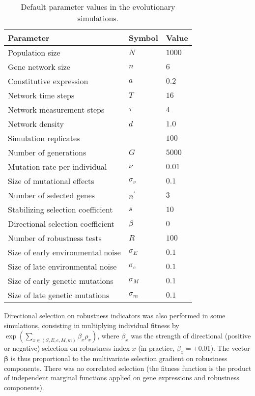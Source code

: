 \documentclass[10pt,a4paper]{article}
\begin{document}
\begin{table}
\begin{tabular}{lll}
Parameter & Symbol & Value \\ \hline
Population size & $N$ & $1000$ \\
Gene network size & $n$ & $6$ \\
Constitutive expression & $a$ & $0.2$ \\
Network time steps & $T$ & $16$ \\
Network measurement steps & $\tau$ & $4$ \\
Network density & $d$ & $1.0$ \\
Simulation replicates & & $100$ \\
Number of generations & $G$ & $5000$ \\
Mutation rate per individual & $\nu$ & $0.01$ \\
Size of mutational effects & $\sigma_\nu$ & $0.1$ \\
Number of selected genes & $n^\prime$ & $3$ \\
Stabilizing selection coefficient & $s$ & $10$ \\
Directional selection coefficient & $\beta$ & $0$ \\
Number of robustness tests & $R$ & $100$ \\
Size of early environmental noise & $\sigma_E$ & $0.1$ \\
Size of late environmental noise & $\sigma_e$ & $0.1$ \\
Size of early genetic mutations & $\sigma_M$ & $0.1$ \\
Size of late genetic mutations & $\sigma_m$ & $0.1$ \\
\end{tabular}

\caption{\label{tab:defpar} Default parameter values in the evolutionary simulations.}
\end{table}

Directional selection on robustness indicators was also performed in some simulations, consisting in multiplying individual fitness by $\exp ( \sum_{x \in (S, E, e, M, m)} \beta_x \rho _x )$, where $\beta_x$ was the strength of directional (positive or negative) selection on robustness index $x$ (in practice, $\beta_x= \pm 0.01$). The vector $\bm\beta$ is thus proportional to the multivariate selection gradient on robustness components. There was no correlated selection (the fitness function is the product of independent marginal functions applied on gene expressions and robustness components). 
\end{document}
